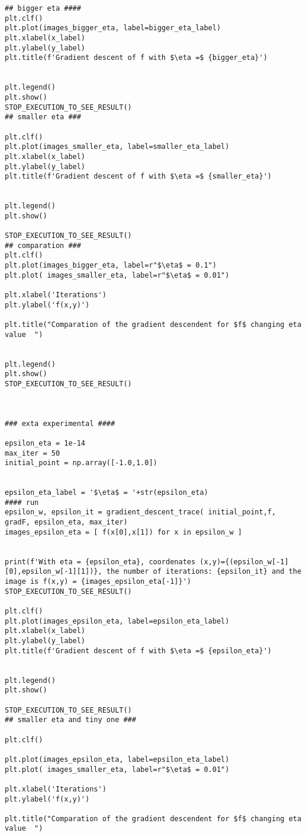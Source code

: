 \begin{verbatim}
## bigger eta ####
plt.clf()
plt.plot(images_bigger_eta, label=bigger_eta_label)
plt.xlabel(x_label)
plt.ylabel(y_label)
plt.title(f'Gradient descent of f with $\eta =$ {bigger_eta}')


plt.legend()
plt.show()
STOP_EXECUTION_TO_SEE_RESULT()
## smaller eta ###

plt.clf()
plt.plot(images_smaller_eta, label=smaller_eta_label)
plt.xlabel(x_label)
plt.ylabel(y_label)
plt.title(f'Gradient descent of f with $\eta =$ {smaller_eta}')


plt.legend()
plt.show()

STOP_EXECUTION_TO_SEE_RESULT()
## comparation ###
plt.clf()
plt.plot(images_bigger_eta, label=r"$\eta$ = 0.1")
plt.plot( images_smaller_eta, label=r"$\eta$ = 0.01")

plt.xlabel('Iterations')
plt.ylabel('f(x,y)')

plt.title("Comparation of the gradient descendent for $f$ changing eta value  ")


plt.legend()
plt.show()
STOP_EXECUTION_TO_SEE_RESULT()



### exta experimental ####

epsilon_eta = 1e-14
max_iter = 50
initial_point = np.array([-1.0,1.0])


epsilon_eta_label = '$\eta$ = '+str(epsilon_eta)
#### run 
epsilon_w, epsilon_it = gradient_descent_trace( initial_point,f, gradF, epsilon_eta, max_iter)
images_epsilon_eta = [ f(x[0],x[1]) for x in epsilon_w ]


print(f'With eta = {epsilon_eta}, coordenates (x,y)={(epsilon_w[-1][0],epsilon_w[-1][1])}, the number of iterations: {epsilon_it} and the image is f(x,y) = {images_epsilon_eta[-1]}')
STOP_EXECUTION_TO_SEE_RESULT()

plt.clf()
plt.plot(images_epsilon_eta, label=epsilon_eta_label)
plt.xlabel(x_label)
plt.ylabel(y_label)
plt.title(f'Gradient descent of f with $\eta =$ {epsilon_eta}')


plt.legend()
plt.show()

STOP_EXECUTION_TO_SEE_RESULT()
## smaller eta and tiny one ###

plt.clf()

plt.plot(images_epsilon_eta, label=epsilon_eta_label)
plt.plot( images_smaller_eta, label=r"$\eta$ = 0.01")

plt.xlabel('Iterations')
plt.ylabel('f(x,y)')

plt.title("Comparation of the gradient descendent for $f$ changing eta value  ")



\end{verbatim}
